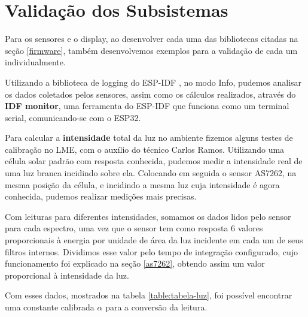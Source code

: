 \documentclass[../monografia.tex]{subfiles}
\begin{document}


\section{Validação dos Subsistemas} %

Para os sensores e o display, ao desenvolver cada uma das bibliotecas citadas na seção \ref{firmware}, também desenvolvemos exemplos para a validação de cada um individualmente. 

Utilizando a biblioteca de logging do ESP-IDF \cite{log-esp}, no modo Info, pudemos analisar os dados coletados pelos sensores, assim como os cálculos realizados, através do \textbf{IDF monitor}, uma ferramenta do ESP-IDF que funciona como um terminal serial, comunicando-se com o ESP32. 

Para calcular a \textbf{intensidade} total da luz no ambiente fizemos alguns testes de calibração no LME, com o auxílio do técnico Carlos Ramos. Utilizando uma célula solar padrão com resposta conhecida, pudemos medir a intensidade real de uma luz branca incidindo sobre ela. Colocando em seguida o sensor AS7262, na mesma posição da célula, e incidindo a mesma luz cuja intensidade é agora conhecida, pudemos realizar medições mais precisas. 

Com leituras para diferentes intensidades, somamos os dados lidos pelo sensor para cada espectro, uma vez que o sensor tem como resposta 6 valores proporcionais à energia por unidade de área da luz incidente em cada um de seus filtros internos. 
Dividimos esse valor pelo tempo de integração configurado, cujo funcionamento foi explicado na seção \ref{as7262}, obtendo assim um valor proporcional à intensidade da luz. 	

Com esses dados, mostrados na tabela \ref{table:tabela-luz}, foi possível encontrar uma constante calibrada $\alpha$  para a conversão da leitura. \newpage
\end{document}
